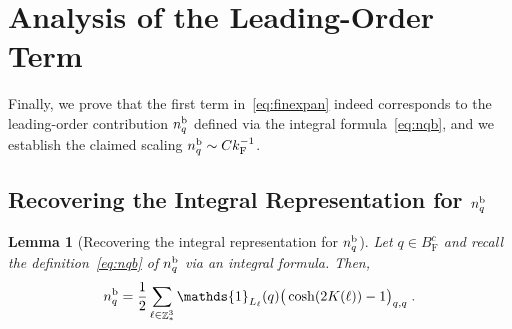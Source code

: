 \documentclass[12pt,a4paper]{article}
\numberwithin{equation}{section}
\newcommand{\1}{\mathbb{I}}
\renewcommand{\b}{\textnormal{b}}
\newcommand{\F}{\mathrm{F}}
\DeclareMathOperator{\Z}{\mathbb{Z}}
\newcommand{\half}{\frac{1}{2}}
\theoremstyle{plain}
\newtheorem{lemma}[theorem]{Lemma}
\theoremstyle{definition}
\theoremstyle{remark}
\theoremstyle{plain}
\theoremstyle{definition}
\theoremstyle{remark}
\begin{document}
\section{Analysis of the Leading-Order Term}
\label{sec:leading_order_analysis}


Finally, we prove that the first term in~\eqref{eq:finexpan} indeed corresponds to the leading-order contribution $ n_q^{\b} $ defined via the integral formula~\eqref{eq:nqb}, and we establish the claimed scaling $ n_q^{\b} \sim C k_{\F}^{-1} $.


\subsection{Recovering the Integral Representation for $ n_q^{\b} $}

\begin{lemma}[Recovering the integral representation for $ n_q^{\b} $] \label{lem:nqb_integralrecovery}
Let $q \in B^c_{\F}$ and recall the definition~\eqref{eq:nqb} of $ n_q^{\b} $ via an integral formula. Then,
\begin{equation} \label{eq:nqb_integralrecovery}
	n_q^{\b} = \half\sum\limits_{\ell\in \Z^3_*}\mathds{1}_{L_\ell}(q) \big( \cosh(2K(\ell)) - 1 \big)_{q,q} \;.
\end{equation}
\end{lemma}
\end{document}
